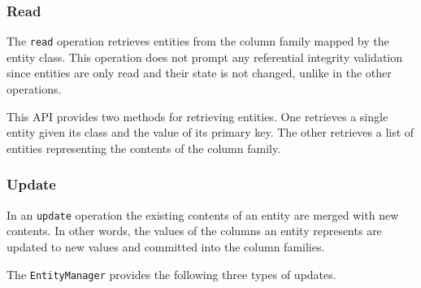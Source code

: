 		\subsubsection{Read}
		The  \texttt{read} operation retrieves  entities from the column family
		mapped by the entity class. 
		This operation does not prompt any referential integrity validation since entities are only read and their state is not changed,  unlike in the other
		operations. 
		
		
		This \ac{API} provides two methods for retrieving entities.  One retrieves a
		single entity given its class and the value of its primary key.  The
		other retrieves a list of entities representing the contents of
		the column family. 

		
		
		\subsubsection{Update}\label{ss:update}
		In an \texttt{update} operation the existing contents of an entity are merged
		with new contents.   In other words,  the  values of the columns an entity
		represents are updated to new values and committed into the column families. 
		
		The \texttt{EntityManager} provides the following three types of updates. 
		
